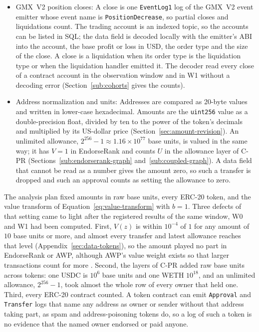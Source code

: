 \begin{itemize}
\item GMX~V2 position closes: A close is one \texttt{EventLog1} log of the GMX~V2 event emitter whose event name is \texttt{PositionDecrease}, so partial closes and liquidations count. The trading account is an indexed topic, so the accounts can be listed in SQL; the data field is decoded locally with the emitter's ABI into the account, the base profit or loss in USD, the order type and the size of the close. A close is a liquidation when its order type is the liquidation type or when the liquidation handler emitted it. The decoder read every close of a contract account in the observation window and in W1 without a decoding error (Section~\ref{sub:cohorts} gives the counts).

\item Address normalization and units: Addresses are compared as 20-byte values and written in lower-case hexadecimal. Amounts are the \texttt{uint256} value as a double-precision float, divided by ten to the power of the token's decimals and multiplied by its US-dollar price (Section~\ref{sec:amount-revision}). An unlimited allowance, $2^{256}-1\approx1.16\times10^{77}$ base units, is valued in the same way; it has $V=1$ in EndorseRank and counts $U$ in the allowance layer of C-PR (Sections~\ref{sub:endorserank-graph} and~\ref{sub:coupled-graph}). A data field that cannot be read as a number gives the amount zero, so such a transfer is dropped and such an approval counts as setting the allowance to zero.

\end{itemize}


The analysis plan fixed amounts in raw base units, every ERC-20 token, and the value transform of Equation~\eqref{eq:value-transform} with $b=1$. Three defects of that setting came to light after the registered results of the same window, W0 and W1 had been computed. First, $V(z)$ is within $10^{-4}$ of $1$ for any amount of $10$ base units or more, and almost every transfer and latest allowance reaches that level (Appendix~\ref{sec:data-tokens}), so the amount played no part in EndorseRank or AWP, although AWP's value weight exists so that larger transactions count for more \parencite{do2023awp}. Second, the layers of C-PR added raw base units across tokens: one USDC is $10^{6}$ base units and one WETH $10^{18}$, and an unlimited allowance, $2^{256}-1$, took almost the whole row of every owner that held one. Third, every ERC-20 contract counted. A token contract can emit \texttt{Approval} and \texttt{Transfer} logs that name any address as owner or sender without that address taking part, as spam and address-poisoning tokens do, so a log of such a token is no evidence that the named owner endorsed or paid anyone.

